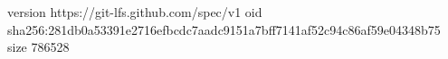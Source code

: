 version https://git-lfs.github.com/spec/v1
oid sha256:281db0a53391e2716efbcdc7aadc9151a7bff7141af52c94c86af59e04348b75
size 786528

